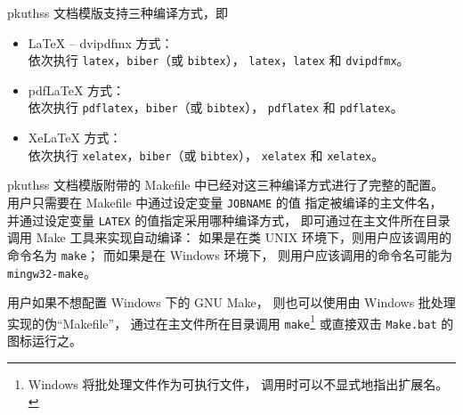 	pkuthss 文档模版支持三种编译方式，即
	\begin{itemize}
		\item \LaTeX{} -- dvipdfmx 方式：\\
			依次执行 \verb|latex|，\verb|biber|（或 \verb|bibtex|），%
			\verb|latex|，\verb|latex| 和 \verb|dvipdfmx|。\\
		\item pdf\LaTeX{} 方式：\\
			依次执行 \verb|pdflatex|，\verb|biber|（或 \verb|bibtex|），%
			\verb|pdflatex| 和 \verb|pdflatex|。
		\item Xe\LaTeX{} 方式：\\
			依次执行 \verb|xelatex|，\verb|biber|（或 \verb|bibtex|），%
			\verb|xelatex| 和 \verb|xelatex|。\\
	\end{itemize}

	pkuthss 文档模版附带的 Makefile 中已经对这三种编译方式进行了完整的配置。
	用户只需要在 Makefile 中通过设定变量 \verb|JOBNAME| 的值%
	指定被编译的主文件名，
	并通过设定变量 \verb|LATEX| 的值指定采用哪种编译方式，
	即可通过在主文件所在目录调用 Make 工具来实现自动编译：
	如果是在类 UNIX 环境下，则用户应该调用的命令名为 \verb|make|；
	而如果是在 Windows 环境下，
	则用户应该调用的命令名可能为 \verb|mingw32-make|。

	用户如果不想配置 Windows 下的 GNU Make，
	则也可以使用由 Windows 批处理实现的伪“Makefile”，
	通过在主文件所在目录调用 \verb|make|\footnote{%
		Windows 将批处理文件作为可执行文件，
		调用时可以不显式地指出扩展名。%
	} 或直接双击 \verb|Make.bat| 的图标运行之。


